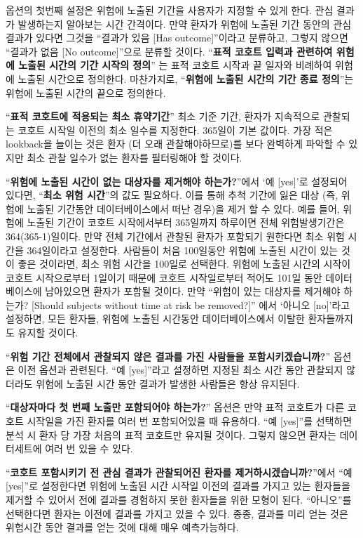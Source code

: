 \documentclass[11pt]{book}
\theoremstyle{definition}
\theoremstyle{definition}
\theoremstyle{definition}
\theoremstyle{remark}
\begin{document}
옵션의 첫번째 설정은 위험에 노출된 기간을 사용자가 지정할 수 있게 한다.
관심 결과가 발생하는지 알아보는 시간 간격이다. 만약 환자가 위험에 노출된
기간 동안의 관심 결과가 있다면 그것을 ``결과가 있음 {[}Has
outcome{]}''이라고 분류하고, 그렇지 않으면 ``결과가 없음 {[}No
outcome{]}''으로 분류할 것이다. ``\textbf{표적 코호트 입력과 관련하여
위험에 노출된 시간의 기간 시작의 정의}'' 는 표적 코호트 시작과 끝 일자와
비례하여 위험에 노출된 시간으로 정의한다. 마찬가지로, ``\textbf{위험에
노출된 시간의 기간 종료 정의}''는 위험에 노출된 시간의 끝으로 정의한다.

``\textbf{표적 코호트에 적용되는 최소 휴약기간}'' 최소 기준 기간, 환자가
지속적으로 관찰되는 코호트 시작일 이전의 최소 일수를 지정한다. 365일이
기본 값이다. 가장 적은 lookback을 늘이는 것은 환자 (더 오래
관찰해야하므로)를 보다 완벽하게 파악할 수 있지만 최소 관찰 일수가 없는
환자를 필터링해야 할 것이다.

``\textbf{위험에 노출된 시간이 없는 대상자를 제거해야 하는가?}''에서 `예
{[}yes{]}'로 설정되어 있다면, ``\textbf{최소 위험 시간}''의 값도
필요하다. 이를 통해 추척 기간에 잃은 대상 (즉, 위험에 노출된 기간동안
데이터베이스에서 떠난 경우)을 제거 할 수 있다. 예를 들어, 위험에 노출된
기간이 코호트 시작에서부터 365일까지 하루이면 전체 위험발생기간은
364(365-1)일이다. 만약 전체 기간에서 관찰된 환자가 포함되기 원한다면
최소 위험 시간을 364일이라고 설정한다. 사람들이 처음 100일동안 위험에
노출된 시간이 있는 것이 좋은 것이라면, 최소 위험 시간을 100일로
선택한다. 위험에 노출된 시간의 시작이 코호트 시작으로부터 1일이기 때문에
코호트 시작일로부터 적어도 101일 동안 데이터베이스에 남아있으면 환자가
포함될 것이다. 만약 ``위험이 있는 대상자를 제거해야 하는가? {[}Should
subjects without time at risk be removed?{]}'' 에서 `아니오
{[}no{]}'라고 설정하면, 모든 환자들, 위험에 노출된 시간동안
데이터베이스에서 이탈한 환자들까지도 유지할 것이다.

``\textbf{위험 기간 전체에서 관찰되지 않은 결과를 가진 사람들을
포함시키겠습니까?}'' 옵션은 이전 옵션과 관련된다. ``예 {[}yes{]}''라고
설정하면 지정된 최소 시간 동안 관찰되지 않더라도 위험에 노출된 시간 동안
결과가 발생한 사람들은 항상 유지된다.

``\textbf{대상자마다 첫 번째 노출만 포함되어야 하는가?}'' 옵션은 만약
표적 코호트가 다른 코호트 시작일을 가진 환자를 여러 번 포함되어있을 때
유용하다. ``예 {[}yes{]}''를 선택하면 분석 시 환자 당 가장 처음의 표적
코호트만 유지될 것이다. 그렇지 않으면 환자는 데이터세트에 여러 번 있을
수 있다.

``\textbf{코호트 포함시키기 전 관심 결과가 관찰되어진 환자를
제거하시겠습니까?}''에서 ``예 {[}yes{]}''로 설정한다면 위험에 노출된
시간 시작일 이전의 결과를 가지고 있는 환자들을 제거할 수 있어서 전에
결과를 경험하지 못한 환자들을 위한 모형이 된다. ``아니오''를 선택한다면
환자는 이전에 결과를 가지고 있을 수 있다. 종종, 결과를 미리 얻는 것은
위험시간 동안 결과를 얻는 것에 대해 매우 예측가능하다.
\end{document}

